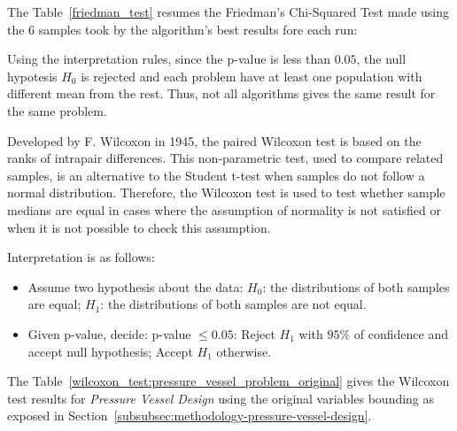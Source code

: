 \documentclass[conference]{IEEEtran}
\begin{document}
The Table~\ref{friedman_test} resumes the Friedman's Chi-Squared Test made using
the 6 samples took by the algorithm's best results fore each run:

\begin{table}[H]
\centering
\caption{Significance Test Using Friedman Chi-Squared Test}
\label{friedman_test}
\end{table}

Using the interpretation rules, since the p-value is less than $0.05$, the null hypotesis $H_0$
is rejected and each problem have at least one population with different mean from the rest.
Thus, not all algorithms gives the same result for the same problem.


Developed by F. Wilcoxon in 1945, the paired Wilcoxon test is based on the ranks
of intrapair differences. This non-parametric test, used to compare related samples,
is an alternative to the Student t-test when samples do not follow a normal distribution.
Therefore, the Wilcoxon test is used to test whether sample medians are equal in cases
where the assumption of normality is not satisfied or when it is not possible to check
this assumption.

Interpretation is as follows:
\begin{itemize}
    \item Assume two hypothesis about the data:
        \subitem $H_0$: the distributions of both samples are equal;
        \subitem $H_1$: the distributions of both samples are not equal.
    \item Given p-value, decide:
        \subitem p-value $\leq 0.05$: Reject $H_1$ with $95\%$ of confidence and accept null hypothesis;
        \subitem Accept $H_1$ otherwise.
\end{itemize}

The Table~\ref{wilcoxon_test:pressure_vessel_problem_original} gives the Wilcoxon test results
for \textit{Pressure Vessel Design} using the original variables bounding as exposed in Section~\ref{subsubsec:methodology-pressure-vessel-design}.
\end{document}
